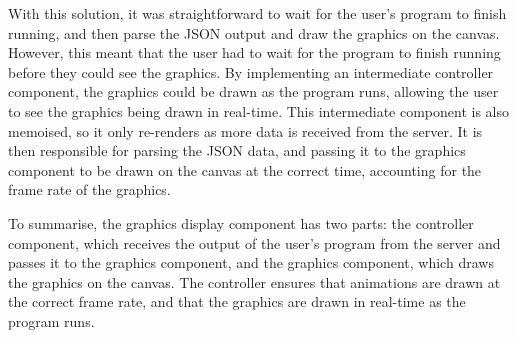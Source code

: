 \documentclass[../main.tex]{subfiles}
\begin{document}
                    With this solution, it was straightforward to wait for the user's program to
                        finish running, and then parse the JSON output and draw the graphics on the
                        canvas.
                    However, this meant that the user had to wait for the program to finish running
                        before they could see the graphics.
                    By implementing an intermediate controller component, the graphics could be
                        drawn as the program runs, allowing the user to see the graphics being drawn in
                        real-time.
                    This intermediate component is also memoised, so it only re-renders as more
                        data is received from the server.
                    It is then responsible for parsing the JSON data, and passing it to the
                        graphics component to be drawn on the canvas at the correct time, accounting
                        for the frame rate of the graphics.

                    To summarise, the graphics display component has two parts: the controller
                        component, which receives the output of the user's program from the server and
                        passes it to the graphics component, and the graphics component, which draws
                        the graphics on the canvas.
                    The controller ensures that animations are drawn at the correct frame rate, and
                        that the graphics are drawn in real-time as the program runs.
\end{document}
